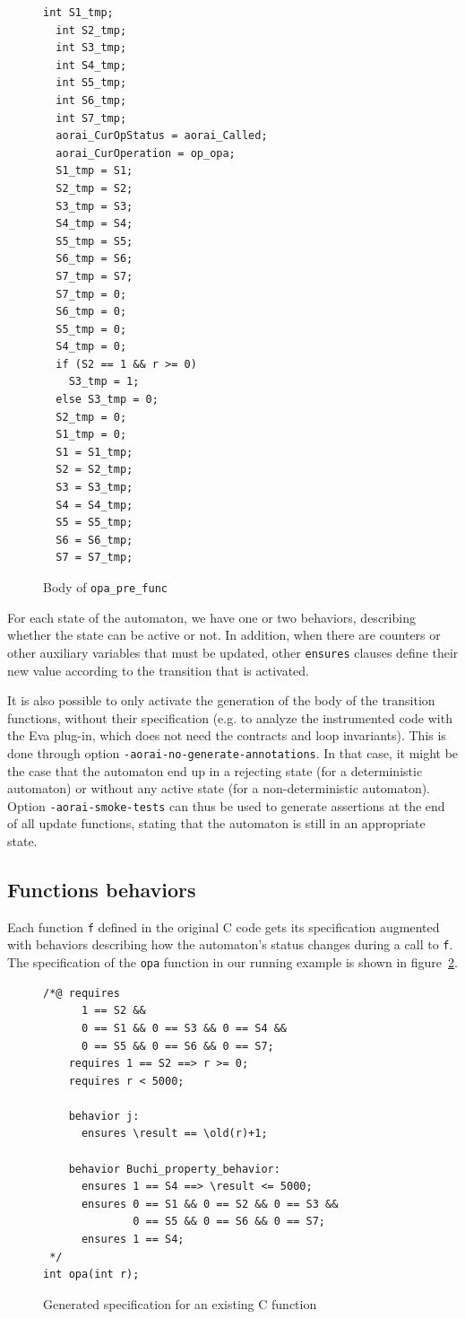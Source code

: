 \documentclass{frama-c-book}
\begin{document}
\begin{figure}[htbp]
\begin{lstlisting}[style=c]
  int S1_tmp;
  int S2_tmp;
  int S3_tmp;
  int S4_tmp;
  int S5_tmp;
  int S6_tmp;
  int S7_tmp;
  aorai_CurOpStatus = aorai_Called;
  aorai_CurOperation = op_opa;
  S1_tmp = S1;
  S2_tmp = S2;
  S3_tmp = S3;
  S4_tmp = S4;
  S5_tmp = S5;
  S6_tmp = S6;
  S7_tmp = S7;
  S7_tmp = 0;
  S6_tmp = 0;
  S5_tmp = 0;
  S4_tmp = 0;
  if (S2 == 1 && r >= 0)
    S3_tmp = 1;
  else S3_tmp = 0;
  S2_tmp = 0;
  S1_tmp = 0;
  S1 = S1_tmp;
  S2 = S2_tmp;
  S3 = S3_tmp;
  S4 = S4_tmp;
  S5 = S5_tmp;
  S6 = S6_tmp;
  S7 = S7_tmp;
\end{lstlisting}
  \caption{Body of \texttt{opa\_pre\_func}}
  \label{fig:pre-func-body}
\end{figure}
For each state of the automaton, we have one or two behaviors, describing
whether the state can be active or not. In addition, when there are counters
or other auxiliary variables that must be updated, other
\lstinline|ensures| clauses define their new value according to the transition
that is activated.

It is also possible to only activate the generation of the body of the
transition functions, without their specification (e.g. to analyze the
instrumented code with the Eva plug-in, which does not need the contracts and
loop invariants). This is done through option
\lstinline|-aorai-no-generate-annotations|. In that case, it might be the case
that the automaton end up in a rejecting state (for a deterministic automaton)
or without any active state (for a non-deterministic automaton). Option
\lstinline|-aorai-smoke-tests| can thus be used to generate assertions at
the end of all update functions, stating that the automaton is still in an
appropriate state.

\subsection{Functions behaviors}

Each function \texttt{f} defined in the original C code gets its specification
augmented with behaviors describing how the automaton's status changes during
a call to \texttt{f}. The specification of the \texttt{opa} function in our
running example is shown in figure~\ref{fig:generated-spec}.
\begin{figure}[ht]
\begin{lstlisting}[style=c]
/*@ requires
      1 == S2 &&
      0 == S1 && 0 == S3 && 0 == S4 &&
      0 == S5 && 0 == S6 && 0 == S7;
    requires 1 == S2 ==> r >= 0;
    requires r < 5000;

    behavior j:
      ensures \result == \old(r)+1;

    behavior Buchi_property_behavior:
      ensures 1 == S4 ==> \result <= 5000;
      ensures 0 == S1 && 0 == S2 && 0 == S3 &&
              0 == S5 && 0 == S6 && 0 == S7;
      ensures 1 == S4;
 */
int opa(int r);
\end{lstlisting}
\caption{Generated specification for an existing C function}
\label{fig:generated-spec}
\end{figure}
\end{document}
